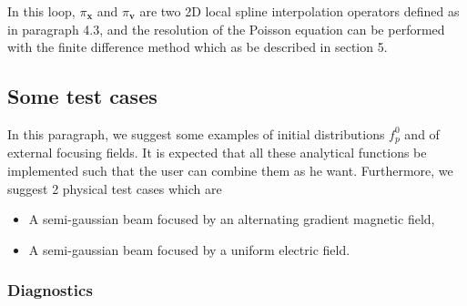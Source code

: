 \documentclass[10pt]{article}
\begin{document}
In this loop, $\pi_{\mathbf{x}}$ and $\pi_{\mathbf{v}}$ are two 2D local spline interpolation operators defined as in paragraph 4.3, and the resolution of the Poisson equation can be performed with the finite difference method which as be described in section 5. \\




\subsection{Some test cases}


In this paragraph, we suggest some examples of initial distributions $f_{p}^{0}$ and of external focusing fields. It is expected that all these analytical functions be implemented such that the user can combine them as he want. Furthermore, we suggest 2 physical test cases which are 
\begin{itemize}
\item A semi-gaussian beam focused by an alternating gradient magnetic field,
\item A semi-gaussian beam focused by a uniform electric field.
\end{itemize}


\subsubsection{Diagnostics}
\end{document}
